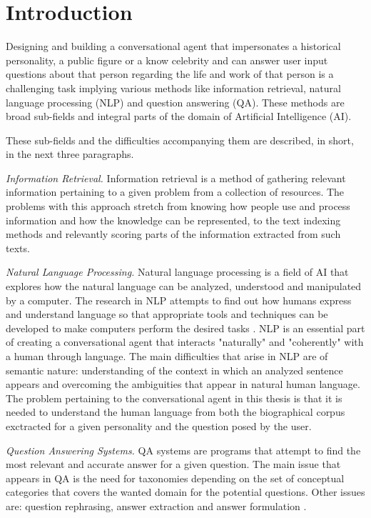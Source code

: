 \chapter{Introduction}
\label{chapter:intro}

Designing and building a conversational agent that impersonates a historical personality, a public figure or a know celebrity and can answer user input questions about that person regarding the life and work of that person is a challenging task implying various methods like information retrieval, natural language processing (NLP) and question answering (QA). These methods are broad sub-fields and integral parts of the domain of Artificial Intelligence (AI).

These sub-fields and the difficulties accompanying them are described, in short, in the next three paragraphs.

{\em Information Retrieval.} Information retrieval is a method of gathering relevant information pertaining to a given problem from a collection of resources. The problems with this approach stretch from knowing how people use and process information and how the knowledge can be represented, to the text indexing methods and relevantly scoring parts of the information extracted from such texts.

{\em Natural Language Processing.} Natural language processing is a field of AI that explores how the natural language can be analyzed, understood and manipulated by a computer. The research in NLP attempts to find out how humans express and understand language so that appropriate tools and techniques can be developed to make computers perform the desired tasks \cite{Chowdhury2003}. NLP is an essential part of creating a conversational agent that interacts "naturally" and "coherently" with a human through language. The main difficulties that arise in NLP are of semantic nature: understanding of the context in which an analyzed sentence appears and overcoming the ambiguities that appear in natural human language. The problem pertaining to the conversational agent in this thesis is that it is needed to understand the human language from both the biographical corpus exctracted for a given personality and the question posed by the user.

{\em Question Answering Systems.} QA systems are programs that attempt to find the most relevant and accurate answer for a given question. The main issue that appears in QA is the need for taxonomies depending on the set of conceptual categories that covers the wanted domain for the potential questions. Other issues are: question rephrasing, answer extraction and answer formulation \cite{Burger2001}.

